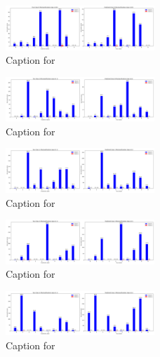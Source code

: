 \documentclass[12pt, a4paper]{article}
\begin{document}
\begin{figure}[ht]
\centering
\includegraphics[width=0.5\textwidth]{combined_class_boundary_pgd/combined_class_9_misclassifications_eps_0.05.png}
\caption{Caption for }
\label{fig:combined_class_9_misclassifications_eps_0.05.png}
\end{figure}

\begin{figure}[ht]
\centering
\includegraphics[width=0.5\textwidth]{combined_class_boundary_pgd/combined_class_0_misclassifications_eps_0.1.png}
\caption{Caption for }
\label{fig:combined_class_0_misclassifications_eps_0.1.png}
\end{figure}

\begin{figure}[ht]
\centering
\includegraphics[width=0.5\textwidth]{combined_class_boundary_pgd/combined_class_1_misclassifications_eps_0.1.png}
\caption{Caption for }
\label{fig:combined_class_1_misclassifications_eps_0.1.png}
\end{figure}

\begin{figure}[ht]
\centering
\includegraphics[width=0.5\textwidth]{combined_class_boundary_pgd/combined_class_3_misclassifications_eps_0.1.png}
\caption{Caption for }
\label{fig:combined_class_3_misclassifications_eps_0.1.png}
\end{figure}

\begin{figure}[ht]
\centering
\includegraphics[width=0.5\textwidth]{combined_class_boundary_pgd/combined_class_2_misclassifications_eps_0.1.png}
\caption{Caption for }
\label{fig:combined_class_2_misclassifications_eps_0.1.png}
\end{figure}
\end{document}
